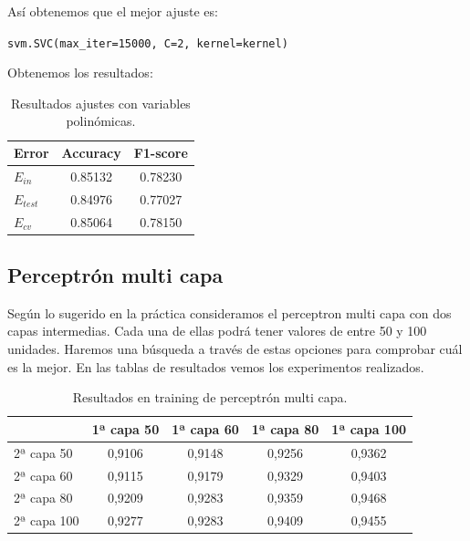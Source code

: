 \documentclass[11pt,a4paper]{article}
\begin{document}
Así obtenemos que el mejor ajuste es:

{\begin{center}
    \texttt{svm.SVC(max\_iter=15000, C=2, kernel=kernel)}
  \end{center}}

Obtenemos los resultados:

\begin{table}[h]
\begin{center}
\begin{tabular}{|l|c|c|}
\hline
  Error & Accuracy & F1-score \\ \hline
  $E_{in}$ & 0.85132 & 0.78230 \\
  $E_{test}$ & 0.84976 & 0.77027  \\
  $E_{cv}$ &0.85064 & 0.78150  \\\hline
\end{tabular}
\caption{Resultados ajustes con variables polinómicas.}

\end{center}
\end{table}

\newpage
\subsection{Perceptrón multi capa}

Según lo sugerido en la práctica consideramos el perceptron multi capa con dos capas intermedias. Cada una de ellas podrá tener valores de entre 50 y 100 unidades. Haremos una búsqueda a través de estas opciones para comprobar cuál es la mejor. En las tablas de resultados vemos los experimentos realizados.

\begin{table}[h]
\begin{center}
\begin{tabular}{|l|c|c|c|c|}
\hline

  & 1ª capa 50 & 1ª capa 60 & 1ª capa 80 & 1ª capa 100 \\ \hline
  2ª capa 50 & 0,9106 & 0,9148 & 0,9256 & 0,9362\\
  2ª capa 60 & 0,9115 & 0,9179 & 0,9329 & 0,9403\\
  2ª capa 80 & 0,9209 & 0,9283 & 0,9359 & 0,9468\\
  2ª capa 100 & 0,9277 & 0,9283 & 0,9409 & 0,9455\\\hline
\end{tabular}
\caption{Resultados en training de perceptrón multi capa.}

\end{center}
\end{table}
\end{document}
